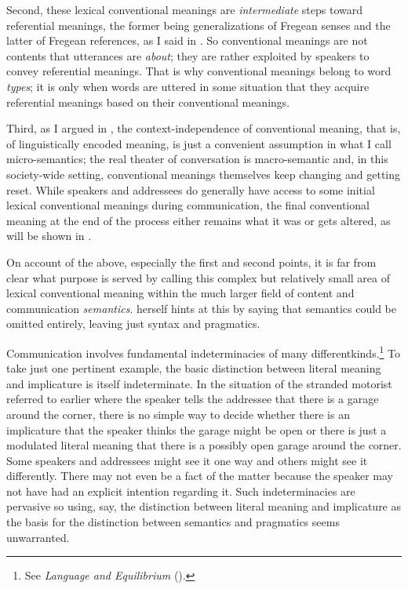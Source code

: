 Second, these lexical conventional meanings are \emph{intermediate} steps toward referential meanings, the former being generalizations of Fregean senses and the latter of Fregean references, as I said in . So conventional meanings are not contents that utterances are \emph{about}; they are rather exploited by speakers to convey referential meanings. That is why conventional meanings belong to word \emph{types}; it is only when words are uttered in some situation that they acquire referential meanings based on their conventional meanings. 

Third, as I argued in , the context-independence of conventional meaning, that is, of linguistically encoded meaning, is just a convenient assumption in what I call micro-semantics; the real theater of conversation is macro-semantic and, in this society-wide setting, conventional meanings themselves keep changing and getting reset. While speakers and addressees do generally have access to some initial lexical conventional meanings during communication, the final conventional meaning at the end of the process either remains what it was or gets altered, as will be shown in . 


On account of the above, especially the first and second points, it is far from clear what purpose is served by calling this complex but relatively small area of lexical conventional meaning within the much larger field of content and communication \emph{semantics}. \citet[Section~4]{carston:lcspd} herself hints at this by saying that semantics could be omitted entirely, leaving just syntax and pragmatics.

Communication involves fundamental indeterminacies of many different\linebreak kinds.\footnote{See \emph{Language and Equilibrium} (\citeyear[Chapter~5]{parikh:le}).} To take just one pertinent example, the basic distinction between literal meaning and implicature is itself indeterminate. In the situation of the stranded motorist referred to earlier where the speaker tells the addressee that there is a garage around the corner, there is no simple way to decide whether there is an implicature that the speaker thinks the garage might be open or there is just a modulated literal meaning that there is a possibly open garage around the corner. Some speakers and addressees might see it one way and others might see it differently. There may not even be a fact of the matter because the speaker may not have had an explicit intention regarding it. Such indeterminacies are pervasive so using, say, the distinction between literal meaning and implicature as the basis for the distinction between semantics and pragmatics seems unwarranted.


